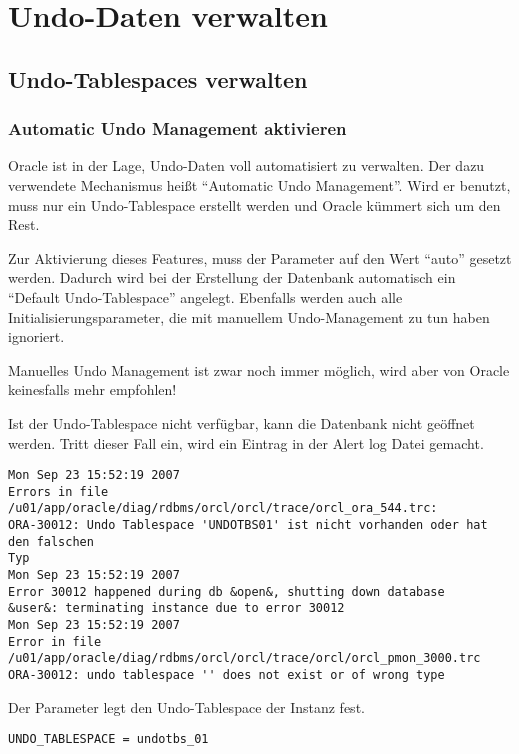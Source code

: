 \chapter{Undo-Daten verwalten}
    \label{undodata}
    \chaptertoc{}
    \cleardoubleevenpage
    
        \section{Undo-Tablespaces verwalten}
      \subsection{Automatic Undo Management aktivieren}
        Oracle ist in der Lage, Undo-Daten voll automatisiert zu verwalten. Der
        dazu verwendete Mechanismus heißt \enquote{Automatic Undo
        Management}. Wird er benutzt, muss nur ein Undo-Tablespace erstellt
        werden und Oracle kümmert sich um den Rest.

        Zur Aktivierung dieses Features, muss der Parameter  auf den Wert \enquote{auto} gesetzt werden. Dadurch wird bei der Erstellung der Datenbank automatisch ein \enquote{Default Undo-Tablespace} angelegt. Ebenfalls werden auch alle Initialisierungsparameter, die mit manuellem Undo-Management zu tun haben ignoriert.
        \begin{merke}
          Manuelles Undo Management ist zwar noch immer möglich, wird aber von Oracle keinesfalls mehr empfohlen!
        \end{merke}
        Ist der Undo-Tablespace nicht verfügbar, kann die Datenbank nicht
        geöffnet werden. Tritt dieser Fall ein, wird ein Eintrag in der Alert
        log Datei gemacht.
        \begin{lstlisting}[caption={Fehlermeldung bei nicht vorhandenem
        Undo-Tablespace},label=admin501,language=terminal]
Mon Sep 23 15:52:19 2007 
Errors in file /u01/app/oracle/diag/rdbms/orcl/orcl/trace/orcl_ora_544.trc:
ORA-30012: Undo Tablespace 'UNDOTBS01' ist nicht vorhanden oder hat den falschen
Typ
Mon Sep 23 15:52:19 2007
Error 30012 happened during db &open&, shutting down database
&user&: terminating instance due to error 30012
Mon Sep 23 15:52:19 2007
Error in file /u01/app/oracle/diag/rdbms/orcl/orcl/trace/orcl/orcl_pmon_3000.trc
ORA-30012: undo tablespace '' does not exist or of wrong type
        \end{lstlisting}
        Der Parameter  legt den Undo-Tablespace der Instanz fest.
        \begin{lstlisting}[caption={Der Parameter \parameter{undo\_management}},label=admin502,language=oracle_sql]
UNDO_TABLESPACE = undotbs_01
        \end{lstlisting}
